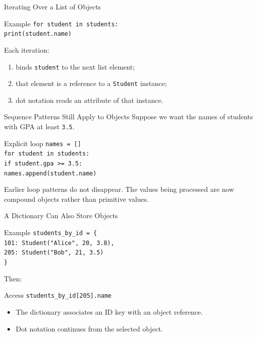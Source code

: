 \documentclass[aspectratio=169,10pt]{beamer}
\begin{document}
\begin{frame}{Iterating Over a List of Objects}
  \begin{block}{Example}
    \texttt{for student in students:}\\
    \hspace*{0.20in}\texttt{print(student.name)}
  \end{block}

  Each iteration:
  \begin{enumerate}
    \item binds \texttt{student} to the next list element;
    \item that element is a reference to a \texttt{Student} instance;
    \item dot notation reads an attribute of that instance.
  \end{enumerate}
\end{frame}

\begin{frame}{Sequence Patterns Still Apply to Objects}
  Suppose we want the names of students with GPA at least \texttt{3.5}.

  \begin{block}{Explicit loop}
    \texttt{names = []}\\
    \texttt{for student in students:}\\
    \hspace*{0.20in}\texttt{if student.gpa >= 3.5:}\\
    \hspace*{0.40in}\texttt{names.append(student.name)}
  \end{block}

  \begin{keyidea}
    Earlier loop patterns do not disappear. The values being processed are now compound objects rather than primitive values.
  \end{keyidea}
\end{frame}

\begin{frame}{A Dictionary Can Also Store Objects}
  \begin{block}{Example}
    \texttt{students\_by\_id = \{}\\
    \hspace*{0.20in}\texttt{101: Student("Alice", 20, 3.8),}\\
    \hspace*{0.20in}\texttt{205: Student("Bob", 21, 3.5)}\\
    \texttt{\}}
  \end{block}

  Then:
  \begin{block}{Access}
    \texttt{students\_by\_id[205].name}
  \end{block}

  \begin{itemize}
    \item The dictionary associates an ID key with an object reference.
    \item Dot notation continues from the selected object.
  \end{itemize}
\end{frame}
\end{document}

